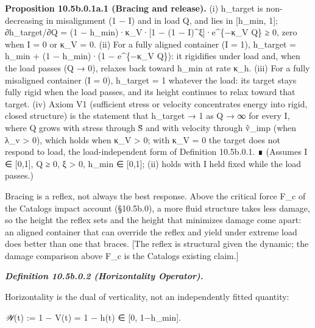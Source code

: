 \documentclass[
]{article}
\begin{document}
\textbf{Proposition 10.5b.0.1a.1 (Bracing and release).} (i) h\_target
is non-decreasing in misalignment (1 − I) and in load Q, and lies in
{[}h\_min, 1{]}; ∂h\_target/∂Q = (1 − h\_min)·κ\_V·{[}1 − (1 −
I)\^{}ξ{]}·e\^{}\{−κ\_V Q\} ≥ 0, zero when I = 0 or κ\_V = 0. (ii) For a
fully aligned container (I = 1), h\_target = h\_min + (1 − h\_min)·(1 −
e\^{}\{−κ\_V Q\}): it rigidifies under load and, when the load passes (Q
→ 0), relaxes back toward h\_min at rate κ\_h. (iii) For a fully
misaligned container (I = 0), h\_target = 1 whatever the load: its
target stays fully rigid when the load passes, and its height continues
to relax toward that target. (iv) Axiom V1 (sufficient stress or
velocity concentrates energy into rigid, closed structure) is the
statement that h\_target → 1 as Q → ∞ for every I, where Q grows with
stress through S̃ and with velocity through ṽ\_imp (when λ\_v
\textgreater{} 0), which holds when κ\_V \textgreater{} 0; with κ\_V = 0
the target does not respond to load, the load-independent form of
Definition 10.5b.0.1. ∎ (Assumes I ∈ {[}0,1{]}, Q ≥ 0, ξ \textgreater{}
0, h\_min ∈ {[}0,1{]}; (ii) holds with I held fixed while the load
passes.)

Bracing is a reflex, not always the best response. Above the critical
force F\_c of the Catalog\textquotesingle s impact account (§10.5b.0), a
more fluid structure takes less damage, so the height the reflex sets
and the height that minimizes damage come apart: an aligned container
that can override the reflex and yield under extreme load does better
than one that braces. {[}The reflex is structural given the dynamic; the
damage comparison above F\_c is the Catalog\textquotesingle s existing
claim.{]}

\emph{\textbf{Definition 10.5b.0.2 (Horizontality Operator).}}

Horizontality is the dual of verticality, not an independently fitted
quantity:

\emph{𝒲}(t) := 1 − V(t) = 1 − h(t) ∈ {[}0, 1−h\_min{]}.
\end{document}
